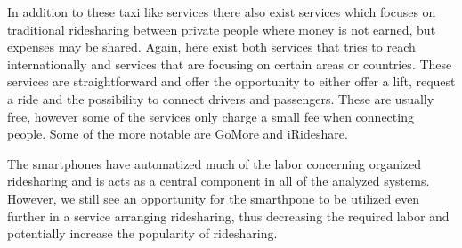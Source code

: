 In addition to these taxi like services there also exist services which focuses on traditional ridesharing between private people where money is not earned, but expenses may be shared.
Again, here exist both services that tries to reach internationally and services that are focusing on certain areas or countries.
These services are straightforward and offer the opportunity to either offer a lift, request a ride and the possibility to connect drivers and passengers.
These are usually free, however some of the services only charge a small fee when connecting people.
Some of the more notable are GoMore and iRideshare.

The smartphones have automatized much of the labor concerning organized ridesharing and is acts as a central component in all of the analyzed systems.
However, we still see an opportunity for the smarthpone to be utilized even further in a service arranging ridesharing, thus decreasing the required labor and potentially increase the popularity of ridesharing.